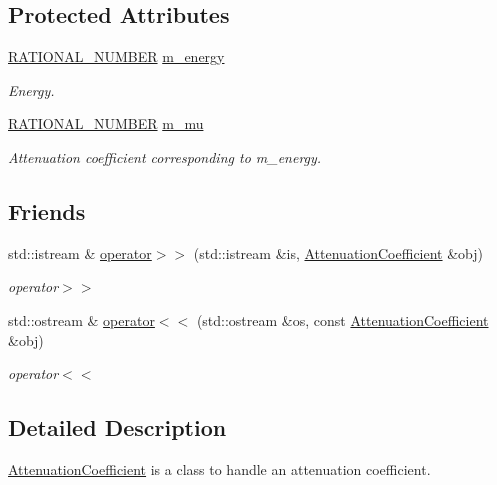 \subsection*{Protected Attributes}
\begin{DoxyCompactItemize}
\item 
\hyperlink{namespace_utilities_a40969b96bd8d847b962e297cb79f08ce}{RATIONAL\_\-NUMBER} \hyperlink{classg_virtual_x_ray_1_1_attenuation_coefficient_a5509f09245e43a41abd163903a47c22e}{m\_\-energy}
\begin{DoxyCompactList}\small\item\em Energy. \end{DoxyCompactList}\item 
\hyperlink{namespace_utilities_a40969b96bd8d847b962e297cb79f08ce}{RATIONAL\_\-NUMBER} \hyperlink{classg_virtual_x_ray_1_1_attenuation_coefficient_a4bd6596ca07d9c736c00839b0e5820d3}{m\_\-mu}
\begin{DoxyCompactList}\small\item\em Attenuation coefficient corresponding to m\_\-energy. \end{DoxyCompactList}\end{DoxyCompactItemize}
\subsection*{Friends}
\begin{DoxyCompactItemize}
\item 
std::istream \& \hyperlink{classg_virtual_x_ray_1_1_attenuation_coefficient_a04665d4b70e8da78c2cf973823f36e0d}{operator$>$$>$} (std::istream \&is, \hyperlink{classg_virtual_x_ray_1_1_attenuation_coefficient}{AttenuationCoefficient} \&obj)
\begin{DoxyCompactList}\small\item\em operator$>$$>$ \end{DoxyCompactList}\item 
std::ostream \& \hyperlink{classg_virtual_x_ray_1_1_attenuation_coefficient_a1716bff7e315423951ad6a583cb209e2}{operator$<$$<$} (std::ostream \&os, const \hyperlink{classg_virtual_x_ray_1_1_attenuation_coefficient}{AttenuationCoefficient} \&obj)
\begin{DoxyCompactList}\small\item\em operator$<$$<$ \end{DoxyCompactList}\end{DoxyCompactItemize}


\subsection{Detailed Description}
\hyperlink{classg_virtual_x_ray_1_1_attenuation_coefficient}{AttenuationCoefficient} is a class to handle an attenuation coefficient. 

